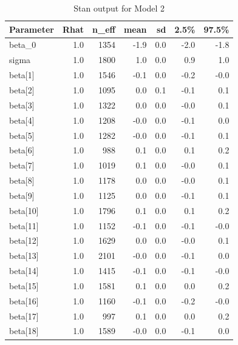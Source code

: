 \documentclass[
]{article}
\begin{document}
\begin{table}[H]
\centering
\begin{tabular}{lrrrrrr}
  \toprule
Parameter & Rhat & n\_eff & mean & sd & 2.5\% & 97.5\% \\ 
  \midrule
beta\_0 & 1.0 & 1354 & -1.9 & 0.0 & -2.0 & -1.8 \\ 
  sigma & 1.0 & 1800 & 1.0 & 0.0 & 0.9 & 1.0 \\ 
  beta[1] & 1.0 & 1546 & -0.1 & 0.0 & -0.2 & -0.0 \\ 
  beta[2] & 1.0 & 1095 & 0.0 & 0.1 & -0.1 & 0.1 \\ 
  beta[3] & 1.0 & 1322 & 0.0 & 0.0 & -0.0 & 0.1 \\ 
  beta[4] & 1.0 & 1208 & -0.0 & 0.0 & -0.1 & 0.0 \\ 
  beta[5] & 1.0 & 1282 & -0.0 & 0.0 & -0.1 & 0.1 \\ 
  beta[6] & 1.0 & 988 & 0.1 & 0.0 & 0.1 & 0.2 \\ 
  beta[7] & 1.0 & 1019 & 0.1 & 0.0 & -0.0 & 0.1 \\ 
  beta[8] & 1.0 & 1178 & 0.0 & 0.0 & -0.0 & 0.1 \\ 
  beta[9] & 1.0 & 1125 & 0.0 & 0.0 & -0.1 & 0.1 \\ 
  beta[10] & 1.0 & 1796 & 0.1 & 0.0 & 0.1 & 0.2 \\ 
  beta[11] & 1.0 & 1152 & -0.1 & 0.0 & -0.1 & -0.0 \\ 
  beta[12] & 1.0 & 1629 & 0.0 & 0.0 & -0.0 & 0.1 \\ 
  beta[13] & 1.0 & 2101 & -0.0 & 0.0 & -0.1 & 0.0 \\ 
  beta[14] & 1.0 & 1415 & -0.1 & 0.0 & -0.1 & -0.0 \\ 
  beta[15] & 1.0 & 1581 & 0.1 & 0.0 & 0.0 & 0.2 \\ 
  beta[16] & 1.0 & 1160 & -0.1 & 0.0 & -0.2 & -0.0 \\ 
  beta[17] & 1.0 & 997 & 0.1 & 0.0 & 0.0 & 0.2 \\ 
  beta[18] & 1.0 & 1589 & -0.0 & 0.0 & -0.1 & 0.0 \\ 
   \bottomrule
\end{tabular}
\caption{Stan output for Model 2} 
\end{table}
\end{document}
